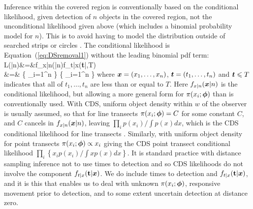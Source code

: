 \documentclass[useAMS,usenatbib,referee]{biom}
\begin{document}
Inference within the covered region is conventionally based on the conditional likelihood, given detection of $n$ objects in the covered region, not the unconditional likelihood given above (which includes a binomial probability model for $n$). This is to avoid having to model the distribution outside of searched strips or circles \citep{Borchers+Burnham:04}. The conditional likelihood is Equation~(\ref{eq:DSremoval1}) without the leading binomial pdf term:
\be
{\cal L}({\bmt{\beta}}|n)&=&f_{x|n}({}|n)f_{t|x}({\bf t}|,\leq T) \nonumber \\
&=&
\left\{
\prod_{i=1}^n
\right\}
\left\{
\prod_{i=1}^n
\right\}
\label{eq:cond.lik}
\ee
\noindent
where $\mbox{\boldmath $x$}=(x_1,\ldots,x_n)$, $\mbox{\boldmath $t$}=(t_1,\ldots,t_n)$ and $\mbox{\boldmath $t$}\leqslant T$ indicates that all of $t_1,\ldots,t_n$ are less than or equal to $T$. Here $f_{x|n}({\mbox{\boldmath $x$}}|n)$ is the conditional likelihood, but allowing a more general form for $\pi(x_i;{\mbox{\boldmath $\phi$}})$ than is conventionally used. With CDS, uniform object density within $w$ of the observer is usually assumed, so that for line transects $\pi(x_i;{\mbox{\boldmath $\phi$}})=C$ for some constant $C$, and $C$ cancels in $f_{x|n}({\mbox{\boldmath $x$}}|n)$, leaving $\prod_i p(x_i)/\int p(x)dx$, which is the CDS conditional likelihood for line transects \citep[see][]{Buckland+al:01}. Similarly, with uniform object density for point transects $\pi(x_i;{\mbox{\boldmath $\phi$}})\propto x_i$ \citep[see][]{Buckland+al:01} giving the CDS point transect conditional likelihood $\prod_i\left\{x_ip(x_i)/\int xp(x)dx\right\}$. It is standard practice with distance sampling inference not to use times to detection and so CDS likelihoods do not involve the component $f_{t|x}({\bf t}|{\mbox{\boldmath $x$}})$. We do include times to detection and $f_{t|x}({\bf t}|{\mbox{\boldmath $x$}})$, and it is this that enables us to deal with unknown $\pi(x_i;{\mbox{\boldmath $\phi$}})$, responsive movement prior to detection, and to some extent uncertain detection at distance zero.
\end{document}
